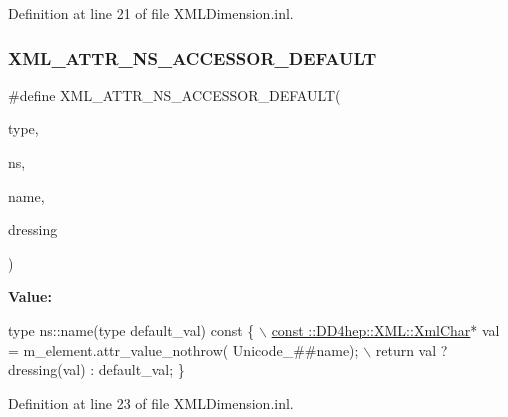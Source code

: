 Definition at line 21 of file X\+M\+L\+Dimension.\+inl.

\hypertarget{_x_m_l_dimension_8inl_a621d9cfc07f37e663ecb8f6c5bd22dfa}{}\label{_x_m_l_dimension_8inl_a621d9cfc07f37e663ecb8f6c5bd22dfa} 
\subsubsection{\texorpdfstring{X\+M\+L\+\_\+\+A\+T\+T\+R\+\_\+\+N\+S\+\_\+\+A\+C\+C\+E\+S\+S\+O\+R\+\_\+\+D\+E\+F\+A\+U\+LT}{XML\_ATTR\_NS\_ACCESSOR\_DEFAULT}}
{\footnotesize\ttfamily \#define X\+M\+L\+\_\+\+A\+T\+T\+R\+\_\+\+N\+S\+\_\+\+A\+C\+C\+E\+S\+S\+O\+R\+\_\+\+D\+E\+F\+A\+U\+LT(\begin{DoxyParamCaption}\item[{}]{type,  }\item[{}]{ns,  }\item[{}]{name,  }\item[{}]{dressing }\end{DoxyParamCaption})}

{\bfseries Value\+:}
\begin{DoxyCode}
type ns::name(type default\_val)\textcolor{keyword}{ const }\{                 \hyperlink{namespace_d_d4hep_1_1_x_m_l_a09e5d9cc86ed782f6826dfe0778c1815}{\(\backslash\)}
\hyperlink{namespace_d_d4hep_1_1_x_m_l_a09e5d9cc86ed782f6826dfe0778c1815}{    const ::DD4hep::XML::XmlChar}* val = m\_element.attr\_value\_nothrow(
      Unicode\_##name); \(\backslash\)
    return val ? dressing(val) : default\_val; \}
\end{DoxyCode}


Definition at line 23 of file X\+M\+L\+Dimension.\+inl.

\hypertarget{_x_m_l_dimension_8inl_a41ecea5c5f5c5ebc82e772c4dea4c97c}{}\label{_x_m_l_dimension_8inl_a41ecea5c5f5c5ebc82e772c4dea4c97c} 
